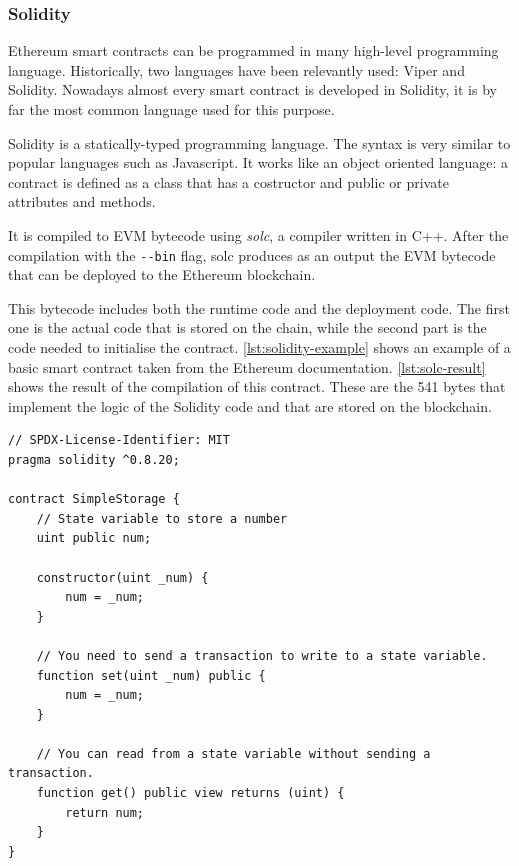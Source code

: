 \subsubsection{Solidity}

Ethereum smart contracts can be programmed in many high-level programming language. Historically, two languages have been relevantly used: Viper and Solidity. Nowadays almost every smart contract is developed in Solidity, it is by far the most common language used for this purpose.

Solidity is a statically-typed programming language. The syntax is very similar to popular languages such as Javascript. It works like an object oriented language: a contract is defined as a class that has a costructor and public or private attributes and methods.

It is compiled to EVM bytecode using \textit{solc}, a compiler written in C++. After the compilation with the \lstinline{--bin} flag, solc produces as an output the EVM bytecode that can be deployed to the Ethereum blockchain.

This bytecode includes both the runtime code and the deployment code. The first one is the actual code that is stored on the chain, while the second part is the code needed to initialise the contract. \cref{lst:solidity-example} shows an example of a basic smart contract taken from the Ethereum documentation. \cref{lst:solc-result} shows the result of the compilation of this contract. These are the 541 bytes that implement the logic of the Solidity code and that are stored on the blockchain.

\begin{lstlisting}[caption={Example of a simple Solidity smart contract that stores a variable on the blockchain and allows edits to it.},label={lst:solidity-example},captionpos=b, style=boxed]
// SPDX-License-Identifier: MIT
pragma solidity ^0.8.20;

contract SimpleStorage {
    // State variable to store a number
    uint public num;

    constructor(uint _num) {
        num = _num;
    }

    // You need to send a transaction to write to a state variable.
    function set(uint _num) public {
        num = _num;
    }

    // You can read from a state variable without sending a transaction.
    function get() public view returns (uint) {
        return num;
    }
}
\end{lstlisting}

